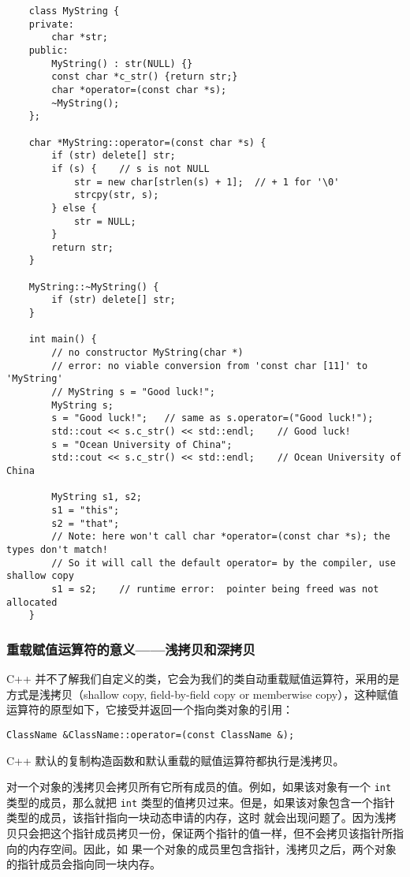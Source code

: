 \documentclass[UTF8]{ctexart}
\begin{document}
\begin{verbatim}
    class MyString {
    private:
        char *str;
    public:
        MyString() : str(NULL) {}
        const char *c_str() {return str;}
        char *operator=(const char *s);
        ~MyString();
    };

    char *MyString::operator=(const char *s) {
        if (str) delete[] str;
        if (s) {    // s is not NULL
            str = new char[strlen(s) + 1];  // + 1 for '\0'
            strcpy(str, s);
        } else {
            str = NULL;
        }
        return str;
    }

    MyString::~MyString() {
        if (str) delete[] str;
    }

    int main() {
        // no constructor MyString(char *)
        // error: no viable conversion from 'const char [11]' to 'MyString'
        // MyString s = "Good luck!";
        MyString s;
        s = "Good luck!";   // same as s.operator=("Good luck!");
        std::cout << s.c_str() << std::endl;    // Good luck!
        s = "Ocean University of China";
        std::cout << s.c_str() << std::endl;    // Ocean University of China

        MyString s1, s2;
        s1 = "this";
        s2 = "that";
        // Note: here won't call char *operator=(const char *s); the types don't match!
        // So it will call the default operator= by the compiler, use shallow copy
        s1 = s2;    // runtime error:  pointer being freed was not allocated
    }
\end{verbatim}

\subsubsection{重载赋值运算符的意义——浅拷贝和深拷贝}
C++ 并不了解我们自定义的类，它会为我们的类自动重载赋值运算符，采用的是方式是浅拷贝（shallow copy,
field-by-field copy or memberwise copy），这种赋值运算符的原型如下，它接受并返回一个指向类对象的引用：
\begin{verbatim}
ClassName &ClassName::operator=(const ClassName &);
\end{verbatim}

C++ 默认的复制构造函数和默认重载的赋值运算符都执行是浅拷贝。

对一个对象的浅拷贝会拷贝所有它所有成员的值。例如，如果该对象有一个 \texttt{int} 类型的成员，那么就把
\texttt{int} 类型的值拷贝过来。但是，如果该对象包含一个指针类型的成员，该指针指向一块动态申请的内存，这时
就会出现问题了。因为浅拷贝只会把这个指针成员拷贝一份，保证两个指针的值一样，但不会拷贝该指针所指向的内存空间。因此，如
果一个对象的成员里包含指针，浅拷贝之后，两个对象的指针成员会指向同一块内存。
\end{document}
